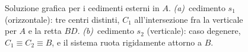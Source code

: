 \begin{figure}[ht]
{
		}
		\caption{Soluzione grafica per i cedimenti esterni in $A$.
			\emph{(a)}~cedimento $s_1$ (orizzontale): tre centri distinti,
			$C_1$ all'intersezione fra la verticale per $A$ e la retta $BD$.
			\emph{(b)}~cedimento $s_2$ (verticale): caso degenere,
			$C_1\equiv C_2\equiv B$, e il sistema ruota rigidamente
			attorno a $B$.}
		\label{fig:arco_cedimenti_esterni}
	\end{figure}

